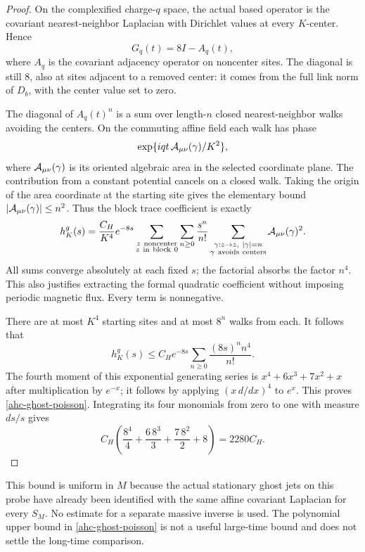 \documentclass[11pt]{article}
\theoremstyle{remark}
\begin{document}
\begin{proof}
On the complexified charge-\(q\) space, the actual based
operator is the covariant nearest-neighbor Laplacian
with Dirichlet values at every \(K\)-center. Hence
\[
 G_q(t)=8I-A_q(t),
\]
where \(A_q\) is the covariant adjacency operator on
noncenter sites. The diagonal is still \(8\), also
at sites adjacent to a removed center: it comes from
the full link norm of \(D_b\), with the center value
set to zero.

The diagonal of \(A_q(t)^n\) is a sum over length-\(n\)
closed nearest-neighbor walks avoiding the centers.
On the commuting affine field each walk has phase
\[
       \exp\{iqt\,{\cal A}_{\mu\nu}(\gamma)/K^2\},
\]
where \({\cal A}_{\mu\nu}(\gamma)\) is its oriented
algebraic area in the selected coordinate plane.
The contribution from a constant potential cancels
on a closed walk. Taking the origin of the area
coordinate at the starting site gives the elementary
bound \(|{\cal A}_{\mu\nu}(\gamma)|\le n^2\).
Thus the block trace coefficient is exactly
\begin{equation}
 h^g_K(s)=\frac{C_H}{K^4}e^{-8s}
   \sum_{\substack{z\ {\rm noncenter}\\z\ {\rm in\ block}\ 0}}
   \sum_{n\ge0}\frac{s^n}{n!}
   \sum_{\substack{\gamma:z\to z,\ |\gamma|=n\\
                    \gamma\ {\rm avoids\ centers}}}
                         {\cal A}_{\mu\nu}(\gamma)^2.
 \label{ahc-ghost-walk}
\end{equation}
All sums converge absolutely at each fixed \(s\);
the factorial absorbs the factor \(n^4\). This
also justifies extracting the formal quadratic
coefficient without imposing periodic magnetic flux.
Every term is nonnegative.

There are at most \(K^4\) starting sites and at most
\(8^n\) walks from each. It follows that
\[
 h^g_K(s)\le C_H e^{-8s}
                   \sum_{n\ge0}\frac{(8s)^n n^4}{n!}.
\]
The fourth moment of this exponential generating
series is \(x^4+6x^3+7x^2+x\) after multiplication
by \(e^{-x}\); it follows by applying
\((x\,d/dx)^4\) to \(e^x\). This proves
\eqref{ahc-ghost-poisson}. Integrating its four
monomials from zero to one with measure \(ds/s\)
gives
\[
 C_H\left(\frac{8^4}{4}
             +\frac{6\,8^3}{3}+\frac{7\,8^2}{2}+8\right)
                         =2280C_H.
\]
\end{proof}

This bound is uniform in \(M\) because the actual
stationary ghost jets on this probe have already
been identified with the same affine covariant
Laplacian for every \(S_M\). No estimate for a
separate massive inverse is used. The polynomial
upper bound in \eqref{ahc-ghost-poisson} is not a
useful large-time bound and does not settle the
long-time comparison.
\end{document}
